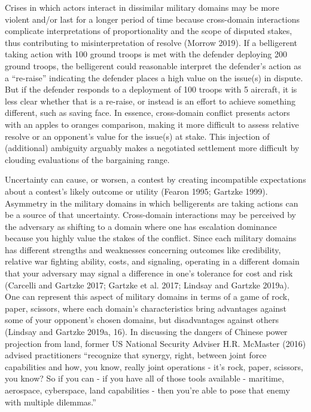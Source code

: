 \documentclass[
]{article}
\begin{document}
Crises in which actors interact in dissimilar military domains may be more violent and/or last for a longer period of time because cross-domain interactions complicate interpretations of proportionality and the scope of disputed stakes, thus contributing to misinterpretation of resolve (Morrow 2019). If a belligerent taking action with 100 ground troops is met with the defender deploying 200 ground troops, the belligerent could reasonable interpret the defender's action as a ``re-raise'' indicating the defender places a high value on the issue(s) in dispute. But if the defender responds to a deployment of 100 troops with 5 aircraft, it is less clear whether that is a re-raise, or instead is an effort to achieve something different, such as saving face. In essence, cross-domain conflict presents actors with an apples to oranges comparison, making it more difficult to assess relative resolve or an opponent's value for the issue(s) at stake. This injection of (additional) ambiguity arguably makes a negotiated settlement more difficult by clouding evaluations of the bargaining range.

Uncertainty can cause, or worsen, a contest by creating incompatible expectations about a contest's likely outcome or utility (Fearon 1995; Gartzke 1999). Asymmetry in the military domains in which belligerents are taking actions can be a source of that uncertainty. Cross-domain interactions may be perceived by the adversary as shifting to a domain where one has escalation dominance because you highly value the stakes of the conflict. Since each military domains has different strengths and weaknesses concerning outcomes like credibility, relative war fighting ability, costs, and signaling, operating in a different domain that your adversary may signal a difference in one's tolerance for cost and risk (Carcelli and Gartzke 2017; Gartzke et al. 2017; Lindsay and Gartzke 2019a). One can represent this aspect of military domains in terms of a game of rock, paper, scissors, where each domain's characteristics bring advantages against some of your opponent's chosen domains, but disadvantages against others (Lindsay and Gartzke 2019a, 16). In discussing the dangers of Chinese power projection from land, former US National Security Adviser H.R. McMaster (2016) advised practitioners ``recognize that synergy, right, between joint force capabilities and how, you know, really joint operations - it's rock, paper, scissors, you know? So if you can - if you have all of those tools available - maritime, aerospace, cyberspace, land capabilities - then you're able to pose that enemy with multiple dilemmas.''
\end{document}

